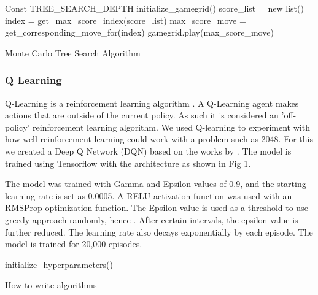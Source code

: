 \documentclass{svproc}
\begin{document}
    \begin{algorithm}[H]
        \SetAlgoLined
        Const TREE\_SEARCH\_DEPTH\;
        initialize\_gamegrid()\;
         {
            score\_list = new list()\;
            index =  get\_max\_score\_index(score\_list)\;
            max\_score\_move = get\_corresponding\_move\_for(index)\;
            gamegrid.play(max\_score\_move)\;
        }
        \caption{Monte Carlo Tree Search Algorithm}
    \end{algorithm}


    \subsubsection{Q Learning}
    Q-Learning is a reinforcement learning algorithm \cite{watkins1992q}. A Q-Learning agent makes actions that are outside of the current policy. As such it is considered an 'off-policy' reinforcement learning algorithm. We used Q-learning to experiment with how well reinforcement learning could work with a problem such as 2048. For this we created a Deep Q Network (DQN) based on the works by \cite{dqnGit}. The model is trained using Tensorflow with the architecture as shown in Fig 1.

    The model was trained with Gamma and Epsilon values of 0.9, and the starting learning rate is set as 0.0005. A RELU activation function was used with an RMSProp optimization function. The Epsilon value is used as a threshold to use greedy approach randomly, hence . After certain intervals, the epsilon value is further reduced. The learning rate also decays exponentially by each episode. The model is trained for 20,000 episodes.

    \begin{algorithm}[H]
        \SetAlgoLined
        initialize_hyperparameters()

        \caption{How to write algorithms}
    \end{algorithm}
\end{document}
